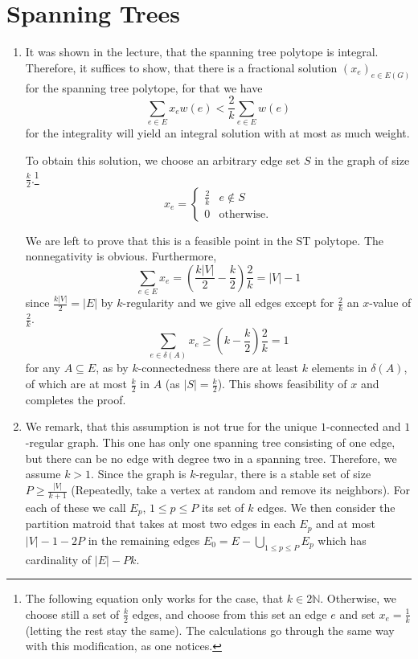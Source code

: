 \documentclass{scrartcl}
\newcommand\1{\mathbf{1}}
\begin{document}
\section{Spanning Trees}
\begin{enumerate}
\item
It was shown in the lecture, that the spanning tree polytope is integral. Therefore, it suffices to show, that there is a fractional solution $(x_e)_{e \in E(G)}$ for the spanning tree polytope, for that we have
\[
\sum_{e \in E} x_e w(e) < \frac{2}{k} \sum_{e \in E} w(e)
\]
for the integrality will yield an integral solution with at most as much weight.

To obtain this solution, we choose an arbitrary edge set $S$ in the graph of size $\frac{k}{2}$.\footnote{\label{footnote}The following equation only works for the case, that $k\in 2\mathbb{N}$. Otherwise, we choose still a set of $\frac{k}{2}$ edges, and choose from this set an edge $e$ and set $x_e = \frac{1}{k}$ (letting the rest stay the same). The calculations go through the same way with this modification, as one notices.}
\[
x_e = \begin{cases} \frac{2}{k} & e \notin S \\ 0 &\text{otherwise.}\end{cases}
\]

We are left to prove that this is a feasible point in the ST polytope. The nonnegativity is obvious. Furthermore,
\[
\sum_{e \in E} x_e =\left( \frac{k\lvert V \rvert}{2} - \frac{k}{2}\right)\frac{2}{k}=\lvert V \rvert - 1
\]
since $\frac{k\lvert V \rvert}{2} = \lvert E \rvert$ by $k$-regularity and we give all edges except for $\frac{2}{k}$ an $x$-value of $\frac{2}{k}$.
\[
\sum_{e \in \delta(A)} x_e \ge \left (k-\frac{k}{2}\right) \frac{2}{k} = 1
\]
for any $A \subseteq E$, as by $k$-connectedness there are at least $k$ elements in $\delta (A)$, of which are at most $\frac{k}{2}$ in $A$ (as $\lvert S \rvert = \frac{k}{2}$). This shows feasibility of $x$ and completes the proof.
\item
We remark, that this assumption is not true for the unique $1$-connected and $1$-regular graph. This one has only one spanning tree consisting of one edge, but there can be no edge with degree two in a spanning tree. Therefore, we assume $k>1$.
Since the graph is $k$-regular, there is a stable set of size $P \ge \frac{|V|}{k+1}$ (Repeatedly, take a vertex at random and remove its neighbors). For each of these we call $E_p$, $1 \leq p \leq P$ its set of $k$ edges. We then consider the partition matroid that takes at most two edges in each $E_p$ and at most $|V| - 1 - 2 P$ in the remaining edges $E_0 = E-\bigcup_{1\le p \le P} E_p$ which has cardinality of $\lvert E\rvert - Pk$.


\end{enumerate}
\end{document}
